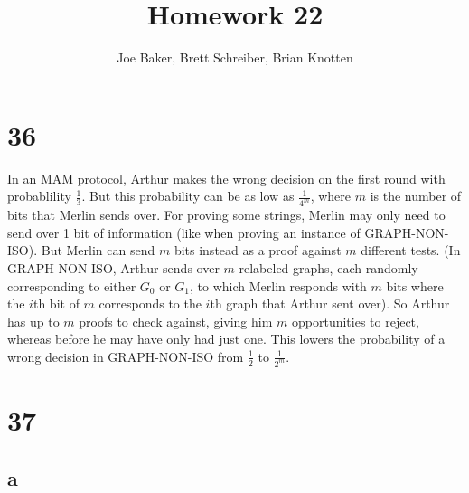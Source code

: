 \documentclass[letterpaper,notitlepage,twoside]{article}
\begin{document}
\title{Homework 22}
\author{Joe Baker, Brett Schreiber, Brian Knotten}
\maketitle

\section*{36}

In an MAM protocol, Arthur makes the wrong decision on the first round with probablility $\frac{1}{3}$. But this probability can be as low as $\frac{1}{4^m}$, where $m$ is the number of bits that Merlin sends over. For proving some strings, Merlin may only need to send over 1 bit of information (like when proving an instance of GRAPH-NON-ISO). But Merlin can send $m$ bits instead as a proof against $m$ different tests. (In GRAPH-NON-ISO, Arthur sends over $m$ relabeled graphs, each randomly corresponding to either $G_0$ or $G_1$, to which Merlin responds with $m$ bits where the $i$th bit of $m$ corresponds to the $i$th graph that Arthur sent over). So Arthur has up to $m$ proofs to check against, giving him $m$ opportunities to reject, whereas before he may have only had just one. This lowers the probability of a wrong decision in GRAPH-NON-ISO from $\frac{1}{2}$ to $\frac{1}{2^m}$.


\section*{37}

\subsection*{a}
\end{document}
